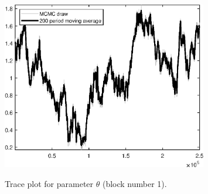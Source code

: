 \begin{figure}[H]
\centering
  \includegraphics[width=0.8\textwidth]{BRS_imp_mobility_alt/graphs/TracePlot_theta_blck_1}\\
    \caption{Trace plot for parameter ${\theta}$ (block number 1).}
\end{figure}
